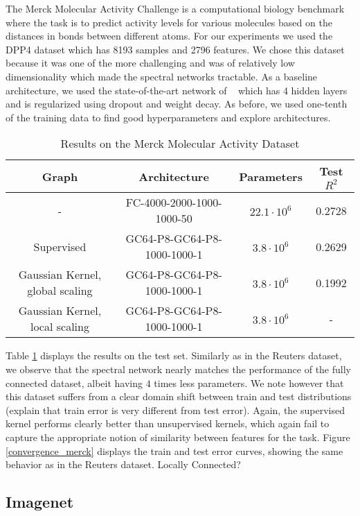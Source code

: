 The Merck Molecular Activity Challenge is a computational biology benchmark where the task is to predict activity levels for various molecules based on the distances in bonds between different atoms. For our experiments we used the DPP4 dataset which has 8193 samples and 2796 features. We chose this dataset because it was one of the more challenging and was of relatively low dimensionality which made the spectral networks tractable. As a baseline architecture, we used the state-of-the-art network of ~\cite{ma2015} which has 4 hidden layers and is regularized using dropout and weight decay. 
As before, we used one-tenth of the training data to find good hyperparameters and explore architectures. 

\begin{table}
\begin{center}
 \begin{tabular}{|c|c|c|c|}
\hline
Graph & Architecture & Parameters & Test $R^2$\\
\hline
- &FC-4000-2000-1000-1000-50 & $22.1 \cdot 10^6$ & 0.2728 \\
Supervised & GC64-P8-GC64-P8-1000-1000-1 & $3.8\cdot 10^6$ & 0.2629 \\
Gaussian Kernel, global scaling & GC64-P8-GC64-P8-1000-1000-1 & $3.8\cdot 10^6$ & 0.1992 \\
Gaussian Kernel, local scaling & GC64-P8-GC64-P8-1000-1000-1 & $3.8\cdot 10^6$ & - \\
\hline
\end{tabular}
\end{center}
\caption{Results on the Merck Molecular Activity Dataset}
\label{merckresults}
\end{table}

Table \ref{merckresults} displays the results on the test set. Similarly as in the Reuters dataset, we observe that the spectral network nearly matches the performance of the fully connected dataset, albeit having $4$ times less parameters. We note however that this dataset suffers from a clear domain shift between train and test distributions (explain that train error is very different from test error).
Again, the supervised kernel performs clearly better than unsupervised kernels, which again fail to capture the appropriate notion of similarity between features for the task. Figure \ref{convergence_merck} displays the train and test error curves, showing the same behavior as in the Reuters dataset. Locally Connected? 



\subsection{Imagenet}

